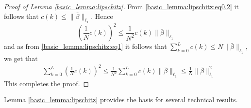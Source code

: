 \documentclass{article}
\begin{document}
\begin{proof}[Proof of Lemma \ref{basic_lemma:lipschitz}]
        From \eqref{basic_lemma:lipschitz:eq0.2}
        it follows that
        $c(k) \le \|\bar{\beta}\|_{\ell_1}$.
        Hence
        \[
         \left(\frac{1}{N} c(k)\right)^2 \le \frac{1}{N^2} c(k)  \|\bar{\beta}\|_{\ell_1}
        \]
        and as from \eqref{basic_lemma:lipschitz:eq1} it follows that $\sum_{k=0}^{L} c(k) \le N \|\bar{\beta}\|_{\ell_1}$, we get that 
        \begin{align*}
        & \sum_{k=0}^{L} \left(\frac{1}{N} c(k)\right)^2 \le 
        \frac{1}{N^2} \sum_{k=0}^{L}  c(k)
        \|\bar{\beta}\|_{\ell_1} \le 
        \frac{1}{N} \|\bar{\beta}\|_{\ell_1}^2
      \end{align*}
      This completes the proof.
    \end{proof}
Lemma \ref{basic_lemma:lipschitz} provides the basis for several
technical results. 
\end{document}

